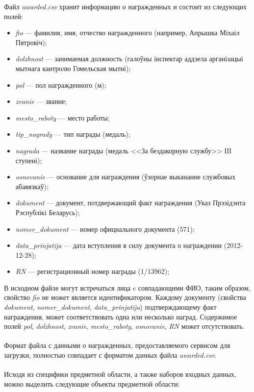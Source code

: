 Файл \textit{awarded.csv} хранит информацию о награжденных и состоит из следующих полей:
\begin{itemize}
\item
  \textit{fio} --- фамилия, имя, отчество награжденного
  (например, Апрышка Міхаіл Пятровіч);
\item
  \textit{dolzhnost} --- занимаемая должность
  (галоўны інспектар аддзела арганізацыі мытнага кантролю Гомельская мытні);
\item
  \textit{pol} --- пол награжденного (м);
\item
  \textit{zvanie} --- звание;
\item
  \textit{mesto\_raboty} --- место работы;
\item 
  \textit{tip\_nagrady} --- тип награды (медаль);
\item
  \textit{nagrada} --- название награды
  (медаль <<За бездакорную службу>> ІIІ ступені);
\item
  \textit{osnovanie} --- основание для награждения
  (ўзорнае выкананне службовых абавязкаў);
\item
  \textit{dokument} --- документ, потдвержающий факт награждения
  (Указ Прэзідэнта Рэспублікі Беларусь);
\item
  \textit{nomer\_dokument} --- номер официального документа
  (571);
\item
  \textit{data\_prinjatija} --- дата вступления в силу документа о награждении
  (2012-12-28);
\item
  \textit{RN} --- регистрационный номер награды (1/13962);
\end{itemize}

В исходном файле могут встречаться лица c совпадающими ФИО,
таким образом, свойство \textit{fio} не может является идентификатором.
Каждому документу (свойства \textit{dokument}, \textit{nomer\_dokument},
\textit{data\_prinjatija})
подтверждающему факт награждения, может соответствовать одна или несколько наград.
Содержимое полей \textit{pol}, \textit{dolzhnost}, \textit{zvanie}, 
\textit{mesto\_raboty}, \textit{osnovanie}, \textit{RN} может отсутствовать.

\paragraph{}
Формат файла с данными о награжденных, предоставляемого сервисом для загрузки,
полностью совпадает с форматом данных файла \textit{awarded.csv}.

\paragraph{}
Исходя из специфики предметной области, а также наборов входных данных, можно выделить
следующие объекты предметной области:

